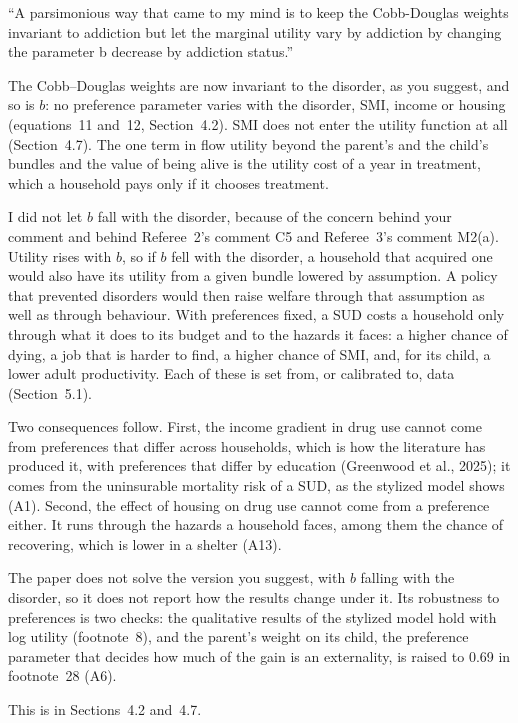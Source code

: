 \documentclass[11pt]{article}
\begin{document}
\begin{referee}
``A parsimonious way that came to my mind is to keep the Cobb-Douglas weights
invariant to addiction but let the marginal utility vary by addiction by changing
the parameter b decrease by addiction status.''
\end{referee}
\begin{response}
The Cobb--Douglas weights are now invariant to the disorder, as you suggest, and so
is $b$: no preference parameter varies with the disorder, SMI, income or housing
(equations~11 and~12, Section~4.2). SMI does not enter the utility function at all
(Section~4.7). The one term in flow utility beyond the parent's and the child's
bundles and the value of being alive is the utility cost of a year in treatment,
which a household pays only if it chooses treatment.

I did not let $b$ fall with the disorder, because of the concern behind your
comment and behind Referee~2's comment C5 and Referee~3's comment M2(a). Utility
rises with $b$, so if $b$ fell with the disorder, a household that acquired one
would also have its utility from a given bundle lowered by assumption. A policy that
prevented disorders would then raise welfare through that assumption as well as
through behaviour. With preferences fixed, a SUD costs a household only through
what it does to its budget and to the hazards it faces: a higher chance of dying, a
job that is harder to find, a higher chance of SMI, and, for its child, a lower
adult productivity. Each of these is set from, or calibrated to, data
(Section~5.1).

Two consequences follow. First, the income gradient in drug use cannot come from
preferences that differ across households, which is how the literature has
produced it, with preferences that differ by education (Greenwood et al., 2025); it
comes from the uninsurable mortality risk of a SUD, as the stylized model shows
(A1). Second, the effect of housing on drug use cannot come from a preference
either. It runs through the hazards a household faces, among them the chance of
recovering, which is lower in a shelter (A13).

\open The paper does not solve the version you suggest, with $b$ falling with the
disorder, so it does not report how the results change under it. Its robustness to
preferences is two checks: the qualitative results of the stylized model hold with
log utility (footnote~8), and the parent's weight on its child, the preference
parameter that decides how much of the gain is an externality, is raised to 0.69 in
footnote~28 (A6).

This is in Sections~4.2 and~4.7.
\end{response}
\end{document}
